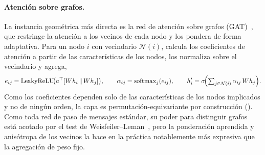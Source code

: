 \paragraph{Atenci\'on sobre grafos.}
La instancia geom\'etrica m\'as directa es la red de atenci\'on sobre grafos
(GAT)~\citep{velickovic2017graph}, que restringe la atenci\'on a los vecinos de
cada nodo y los pondera de forma adaptativa. Para un nodo $i$ con vecindario
$\mathcal{N}(i)$, calcula los coeficientes de atenci\'on a partir de las
caracter\'isticas de los nodos, los normaliza sobre el vecindario y agrega,
\[
  e_{ij} = \operatorname{LeakyReLU}\!\bigl(a^\top[Wh_i \,\|\, Wh_j]\bigr),
  \qquad
  \alpha_{ij} = \operatorname{softmax}_j(e_{ij}),
  \qquad
  h_i' = \sigma\!\Bigl(\textstyle\sum_{j\in\mathcal{N}(i)} \alpha_{ij}\,Wh_j\Bigr).
\]
Como los coeficientes dependen solo de las caracter\'isticas de los nodos
implicados y no de ning\'un orden, la capa es permutaci\'on-equivariante por
construcci\'on (). Como toda red de paso de mensajes
est\'andar, su poder para distinguir grafos est\'a acotado por el test de
Weisfeiler--Leman~\citep{xu2019how}, pero la ponderaci\'on aprendida y
anis\'otropa de los vecinos la hace en la pr\'actica notablemente m\'as expresiva
que la agregaci\'on de peso fijo.

